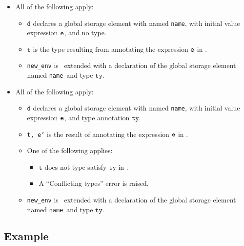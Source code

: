 \documentclass{book}
\newcommand\name[0]{\texttt{name}}
\newcommand\vt[0]{\texttt{t}}
\newcommand\tty[0]{\texttt{ty}}
\begin{document}
\begin{itemize}
  \item All of the following apply:
  \begin{itemize}
    \item \texttt{d} declares a global storage element with named \name, with initial value expression $\texttt{e}$, and no type.
    \item $\vt$ is the type resulting from annotating the expression $\texttt{e}$ in \tenv.
    \item \texttt{new\_env} is \tenv\ extended with a declaration of the global storage element named \name\ and type $\tty$.
  \end{itemize}

  \item All of the following apply:
  \begin{itemize}
    \item \texttt{d} declares a global storage element with named \name, with initial value expression $\texttt{e}$, and type annotation $\tty$.
    \item \texttt{t, e'} is the result of annotating the expression $\texttt{e}$ in \tenv.
    \item One of the following applies:
    \begin{itemize}
      \item $\vt$ does not type-satisfy $\tty$ in \tenv.
      \item A ``Conflicting types'' error is raised.
    \end{itemize}
    \item \texttt{new\_env} is \tenv\ extended with a declaration of the global storage element named \name\ and type $\tty$.
  \end{itemize}
\end{itemize}

\subsection{Example}
\end{document}
